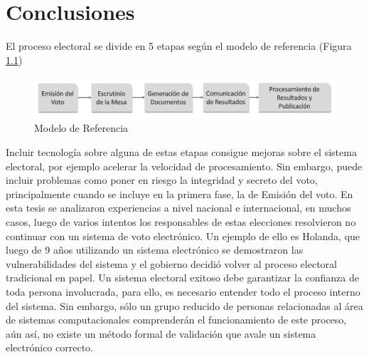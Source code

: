 \label{conclusiones}
\chapter{Conclusiones}

El proceso electoral se divide en 5 etapas según el modelo de referencia \cite{conicet} (Figura \ref{graf:modeloReferencia})
\begin{figure}[h!]
    \begin{center}
        \includegraphics[width=\textwidth]{img/modeloReferencia.png}
    \end{center}
  \caption{Modelo de Referencia}
  \label{graf:modeloReferencia}
\end{figure}
\newline
Incluir tecnología sobre alguna de estas etapas consigue mejoras sobre el sistema electoral, por ejemplo acelerar la velocidad de procesamiento. Sin embargo, puede incluir problemas como  poner en riesgo la integridad y secreto del voto, principalmente cuando se incluye en la primera fase, la de Emisión del voto. En esta tesis se analizaron experiencias a nivel nacional e internacional, en muchos casos, luego de varios intentos los responsables de estas elecciones resolvieron no continuar con un sistema de voto electrónico. Un ejemplo de ello es Holanda, que luego de 9 años utilizando un sistema electrónico se demostraron las vulnerabilidades del sistema y el gobierno decidió volver al proceso electoral tradicional en papel. Un sistema electoral exitoso debe garantizar la confianza de toda persona involucrada, para ello, es necesario entender todo el proceso interno del sistema. Sin embargo, sólo un grupo reducido de personas relacionadas al área de sistemas computacionales comprenderán el funcionamiento de este proceso, aún así, no existe un método formal de validación que avale un sistema electrónico correcto. \newline
